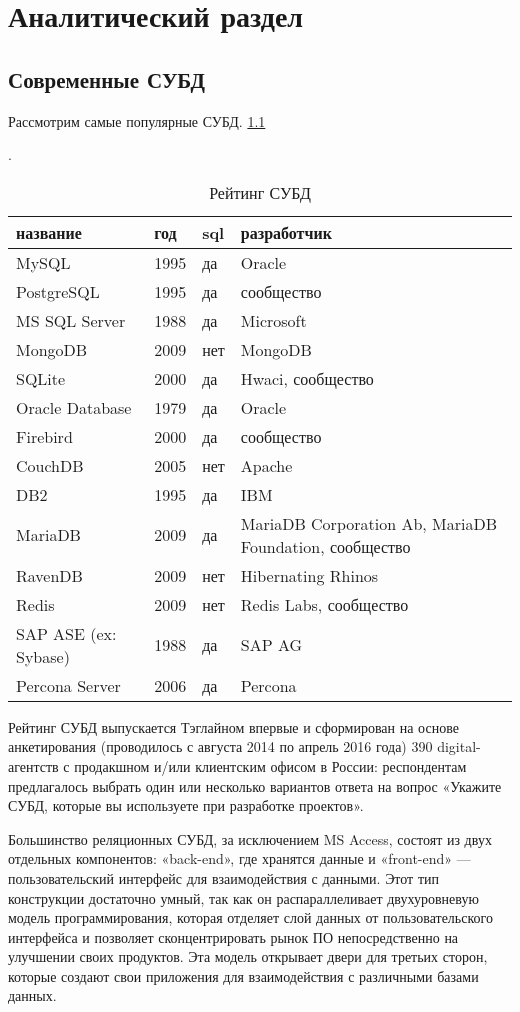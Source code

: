 \chapter{Аналитический раздел}

\section{Современные СУБД}

Рассмотрим самые популярные СУБД. \ref{table:list_dbms}

\begin{table}[h]
\caption{Рейтинг СУБД}\label{table:list_dbms}.
\medskip
\begin{tabular}{|l|l|l|p{9cm}|}
\hline
название & год & sql & разработчик\\
\hline
MySQL & 1995 & да & Oracle\\
PostgreSQL & 1995 & да & сообщество\\
MS SQL Server & 1988 & да & Microsoft\\
MongoDB & 2009 & нет & MongoDB\\
SQLite & 2000 & да & Hwaci, сообщество\\
Oracle Database & 1979 & да & Oracle\\
Firebird & 2000 & да & сообщество\\
CouchDB & 2005 & нет & Apache\\
DB2 & 1995 & да & IBM\\
MariaDB & 2009 & да & MariaDB Corporation Ab, MariaDB Foundation, сообщество\\
RavenDB & 2009 & нет & Hibernating Rhinos\\
Redis & 2009 & нет & Redis Labs, сообщество\\
SAP ASE (ex: Sybase) & 1988 & да & SAP AG\\
Percona Server & 2006 & да & Percona\\
\hline
\end{tabular}
\end{table}

Рейтинг СУБД выпускается Тэглайном впервые и сформирован на основе анкетирования (проводилось с августа 2014 по апрель 2016 года) 390 digital-агентств с продакшном и/или клиентским офисом в России: респондентам предлагалось выбрать один или несколько вариантов ответа на вопрос «Укажите СУБД, которые вы используете при разработке проектов». \cite{tagline.ru:List_DBMS}

Большинство реляционных СУБД, за исключением MS Access, состоят из двух отдельных компонентов: «back-end», где хранятся данные и «front-end» — пользовательский интерфейс для взаимодействия с данными. Этот тип конструкции достаточно умный, так как он распараллеливает двухуровневую модель программирования, которая отделяет слой данных от пользовательского интерфейса и позволяет сконцентрировать рынок ПО непосредственно на улучшении своих продуктов. Эта модель открывает двери для третьих сторон, которые создают свои приложения для взаимодействия с различными базами данных. \cite{habrahabr.ru:10_best_tools} 

